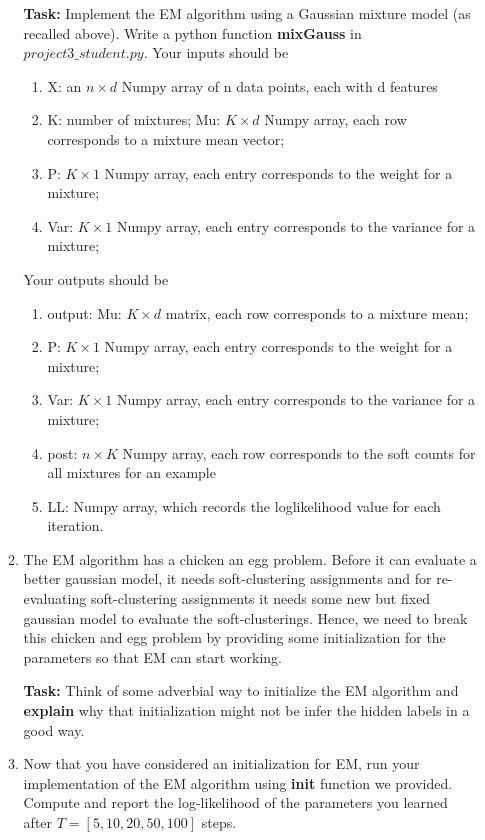 \begin{enumerate}
\begin{enumerate}
    \textbf{Task:} Implement the EM algorithm using a Gaussian mixture model (as recalled above). Write a python function
    \textbf{mixGauss} in \texttt{$project3\_student.py$}. Your inputs should be
    \begin{enumerate}
    \item X: an $n \times d$ Numpy array of n data points, each with d features
    \item K: number of mixtures; Mu: $K \times d$ Numpy array, each row corresponds to a mixture mean vector;
    \item P: $K \times 1$ Numpy array, each entry corresponds to the weight for a mixture;
    \item Var: $K \times 1$ Numpy array, each entry corresponds to the variance for a mixture;
    \end{enumerate}
    Your outputs should be
    \begin{enumerate}
    \item output: Mu: $K \times d$ matrix, each row corresponds to a mixture mean;
    \item P: $K \times 1$ Numpy array, each entry corresponds to the weight for a mixture;
    \item Var: $K \times 1$ Numpy array, each entry corresponds to the variance for a mixture;
    \item post: $n \times K$ Numpy array, each row corresponds to the soft counts for all mixtures for an example
    \item LL: Numpy array, which records the loglikelihood value for each iteration.
    \end{enumerate}

\item The EM algorithm has a chicken an egg problem. Before it can evaluate a better gaussian model, it needs soft-clustering assignments and for re-evaluating soft-clustering assignments it needs some new but fixed gaussian model to evaluate the soft-clusterings. Hence, we need to break this chicken and egg problem by providing some initialization for the parameters so that EM can start working.

	\textbf{Task:} Think of some adverbial way to initialize the EM algorithm and \textbf{explain} why that initialization might not be infer the hidden labels in a good way.

\item Now that you have considered an initialization for EM, run your implementation of the EM algorithm using \textbf{init} function we provided. Compute and report the log-likelihood of the parameters you learned after $T=[5, 10, 20, 50, 100]$ steps.


\end{enumerate}
\end{enumerate}
